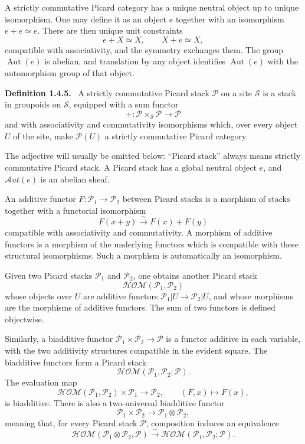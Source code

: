 \documentclass[12pt]{article}
\newcommand{\Ss}{\mathcal S}
\newcommand{\Pp}{\mathcal P}
\newenvironment{statement}[1]{\par\medskip\noindent\textbf{#1.}\ }{\par\medskip}
\begin{document}
A strictly commutative Picard category has a unique neutral object up to unique isomorphism. One may define it as an object \(e\) together with an isomorphism \(e+e\simeq e\). There are then unique unit constraints
\[
e+X\simeq X,
\qquad
X+e\simeq X,
\]
compatible with associativity, and the symmetry exchanges them. The group \(\operatorname{Aut}(e)\) is abelian, and translation by any object identifies \(\operatorname{Aut}(e)\) with the automorphism group of that object.

\begin{statement}{Definition 1.4.5}
A strictly commutative Picard stack \(\Pp\) on a site \(\Ss\) is a stack in groupoids on \(\Ss\), equipped with a sum functor
\[
+ : \Pp\times_{\Ss}\Pp\to\Pp
\]
and with associativity and commutativity isomorphisms which, over every object \(U\) of the site, make \(\Pp(U)\) a strictly commutative Picard category.
\end{statement}

The adjective will usually be omitted below: ``Picard stack'' always means strictly commutative Picard stack. A Picard stack has a global neutral object \(e\), and \(\mathcal{A}ut(e)\) is an abelian sheaf.

An additive functor \(F:\Pp_1\to\Pp_2\) between Picard stacks is a morphism of stacks together with a functorial isomorphism
\[
F(x+y)\xrightarrow{\sim}F(x)+F(y)
\]
compatible with associativity and commutativity. A morphism of additive functors is a morphism of the underlying functors which is compatible with these structural isomorphisms. Such a morphism is automatically an isomorphism.

Given two Picard stacks \(\Pp_1\) and \(\Pp_2\), one obtains another Picard stack
\[
\mathcal{HOM}(\Pp_1,\Pp_2)
\]
whose objects over \(U\) are additive functors \(\Pp_1|U\to\Pp_2|U\), and whose morphisms are the morphisms of additive functors. The sum of two functors is defined objectwise.

Similarly, a biadditive functor \(\Pp_1\times\Pp_2\to\Pp\) is a functor additive in each variable, with the two additivity structures compatible in the evident square. The biadditive functors form a Picard stack
\[
\mathcal{HOM}(\Pp_1,\Pp_2;\Pp).
\]
The evaluation map
\[
\mathcal{HOM}(\Pp_1,\Pp_2)\times\Pp_1\to\Pp_2,
\qquad (F,x)\longmapsto F(x),
\]
is biadditive. There is also a two-universal biadditive functor
\[
\Pp_1\times\Pp_2\to\Pp_1\otimes\Pp_2,
\]
meaning that, for every Picard stack \(\Pp\), composition induces an equivalence
\[
\mathcal{HOM}(\Pp_1\otimes\Pp_2,\Pp)
\xrightarrow{\sim}
\mathcal{HOM}(\Pp_1,\Pp_2;\Pp).
\tag{1.4.8.1}
\]
\end{document}
